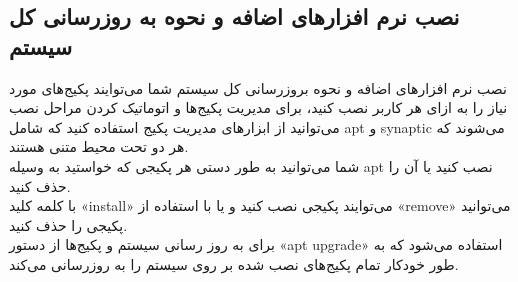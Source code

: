 \subsection{ نصب نرم افزارهای اضافه و نحوه به روزرسانی کل سیستم}
\begin{frame}{نصب نرم افزارهای اضافه و نحوه بروزرسانی کل سیستم}
  شما می‌توایند پکیج‌های مورد نیاز را به ازای هر کاربر نصب کنید، برای مدیریت پکیج‌ها و اتوماتیک کردن مراحل نصب می‌توانید از ابزارهای مدیریت پکیج استفاده کنید که شامل apt و synaptic می‌شوند که هر دو تحت محیط متنی هستند.\\
  شما می‌توانید به طور دستی هر پکیجی که خواستید به وسیله apt نصب کنید یا آن را حذف کنید.\\
  با کلمه کلید «install» می‌توایند پکیجی نصب کنید و یا با استفاده از «remove» می‌توانید پکیجی را حذف کنید.\\

  برای به روز رسانی سیستم و پکیج‌ها از دستور «apt upgrade» استفاده می‌شود که به طور خودکار تمام پکیج‌های نصب شده بر روی سیستم را به روزرسانی می‌کند.
\end{frame}


